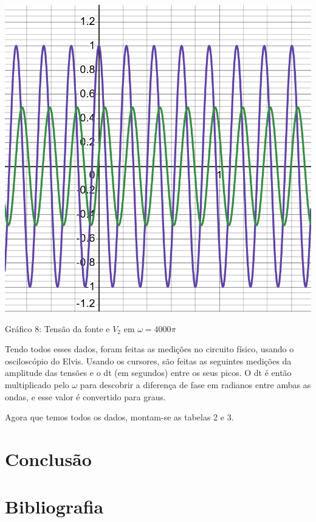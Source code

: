 \documentclass[a4 paper]{article}
\begin{document}
\vspace{30pt}
\begin{table}[h]
\centering
\includegraphics[scale=0.3]{rgadicoas/grafico8}
\end{table}

\begin{center}
Gráfico 8: Tensão da fonte e $V_2$ em $\omega =4000\pi$
\end{center}

\newpage
Tendo todos esses dados, foram feitas as medições no circuito físico, usando o osciloscópio do Elvis. Usando os cursores, são feitas as seguintes medições da amplitude das tensões e o dt (em segundos) entre os seus picos. O dt é então multiplicado pelo $\omega$ para descobrir a diferença de fase em radianos entre ambas as ondas, e esse valor é convertido para graus. 



\newpage
Agora que temos todos os dados, montam-se as tabelas 2 e 3.







\newpage
\section{Conclusão}

\section{Bibliografia}
\end{document}
